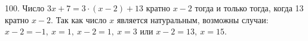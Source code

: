 100. Число $3x+7=3\cdot(x-2)+13$ кратно $x-2$ тогда и только тогда, когда 13 кратно $x-2.$ Так как число $x$ является натуральным, возможны случаи: $x-2=-1,\ x=1,\ x-2=1,\ x=3$ или $x-2=13,\ x=15.$\\
